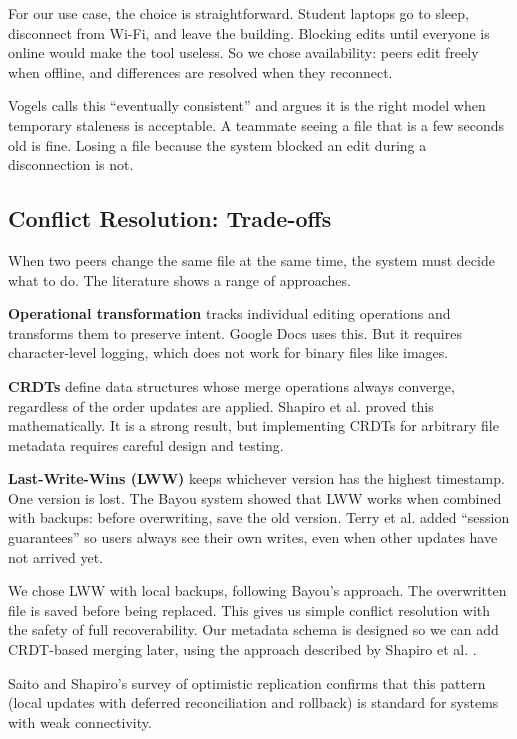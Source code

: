 For our use case, the choice is straightforward. Student laptops go to sleep, disconnect from Wi-Fi, and leave the building. Blocking edits until everyone is online would make the tool useless. So we chose availability: peers edit freely when offline, and differences are resolved when they reconnect.

Vogels \citeyear{vogels2009} calls this ``eventually consistent'' and argues it is the right model when temporary staleness is acceptable. A teammate seeing a file that is a few seconds old is fine. Losing a file because the system blocked an edit during a disconnection is not.

\subsection{Conflict Resolution: Trade-offs}

When two peers change the same file at the same time, the system must decide what to do. The literature shows a range of approaches.

\textbf{Operational transformation} \cite{sun1998} tracks individual editing operations and transforms them to preserve intent. Google Docs uses this. But it requires character-level logging, which does not work for binary files like images.

\textbf{CRDTs} \cite{shapiro2011} define data structures whose merge operations always converge, regardless of the order updates are applied. Shapiro et al. proved this mathematically. It is a strong result, but implementing CRDTs for arbitrary file metadata requires careful design and testing.

\textbf{Last-Write-Wins (LWW)} keeps whichever version has the highest timestamp. One version is lost. The Bayou system \cite{bayou1995} showed that LWW works when combined with backups: before overwriting, save the old version. Terry et al. \citeyear{terry1994} added ``session guarantees'' so users always see their own writes, even when other updates have not arrived yet.

We chose LWW with local backups, following Bayou's approach. The overwritten file is saved before being replaced. This gives us simple conflict resolution with the safety of full recoverability. Our metadata schema is designed so we can add CRDT-based merging later, using the approach described by Shapiro et al. \citeyear{shapiro2011}.

Saito and Shapiro's \citeyear{saito2005} survey of optimistic replication confirms that this pattern (local updates with deferred reconciliation and rollback) is standard for systems with weak connectivity.

